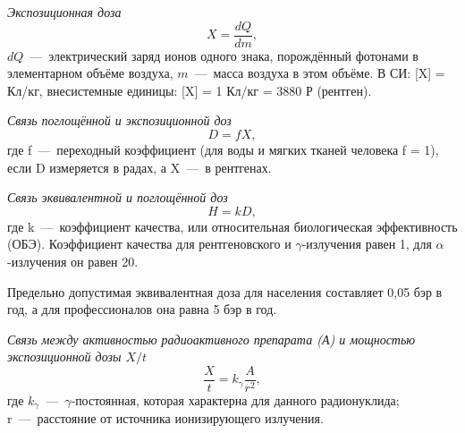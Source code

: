 \documentclass[a4paper, fontsize=14pt]{extreport}
\begin{document}
\textit{Экспозиционная доза}
\begin{equation}
  X = \frac{dQ}{dm},
\end{equation}
$dQ$~---~электрический заряд ионов одного знака, порождённый фотонами в элементарном объёме воздуха, $m$~---~масса воздуха в этом объёме. В СИ: [X] = Кл/кг, внесистемные единицы: [X] = 1 Кл/кг = 3880 Р (рентген). %

\textit{Связь поглощённой и экспозиционной доз}
\begin{equation} \label{absorbAndExposition}
  D = fX,
\end{equation}
где f~---~переходный коэффициент (для воды и мягких тканей человека f = 1), если D измеряется в радах, а X~---~в рентгенах.

\textit{Связь эквивалентной и поглощённой доз}
\begin{equation} \label{equivalentDoze}
  H = kD,
\end{equation}
где k~---~коэффициент качества, или относительная биологическая эффективность (ОБЭ). Коэффициент качества для рентгеновского и $\gamma$-излучения равен 1, для $\alpha$-излучения он равен 20.

Предельно допустимая эквивалентная доза для населения составляет 0,05 бэр в год, а для профессионалов она равна 5 бэр в год.

\textit{Связь между активностью радиоактивного препарата (А) и мощностью экспозиционной дозы $X/t$}
\begin{equation} \label{powerExposureDose}
  \frac{X}{t} = k_\gamma \frac{A}{r^2},
\end{equation}
где $k_\gamma$~---~$\gamma$-постоянная, которая характерна для данного радионуклида; r~---~расстояние от источника ионизирующего излучения.
\end{document}
